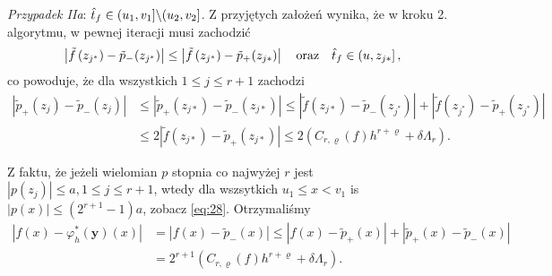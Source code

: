 \documentclass[oik, pdftex, robocza, man]{mgrwms}
\begin{document}
    \textit{Przypadek IIa}: $\hat{t}_{f} \in (u_{1}, v_{1}] \backslash (u_{2}, v_{2}]$.
    Z przyjętych założeń wynika, że w kroku 2. algorytmu, w pewnej iteracji musi zachodzić
    \begin{equation*}
        \left|\tilde{f}\left(z_{j^{*}}\right)-\tilde{p}_{-\!}\left(z_{j^{*}}\right)\right| \leq\left|\tilde{f}\left(z_{j^{*}}\right)-\tilde{p}_{+\!}\left(z_{j *}\right)\right| \quad \text{oraz} \quad \hat{t}_{f} \in\left(u, z_{j *}\right],
    \end{equation*}
    co powoduje, że dla wszystkich $1 \leq j \leq r+1$ zachodzi
    \begin{equation*}
        \begin{aligned}
            \left|\tilde{p}_{+}\left(z_{j}\right)-\tilde{p}_{-}\left(z_{j}\right)\right| & 
            \leq\left|\tilde{p}_{+}\left(z_{j *}\right)-\tilde{p}_{-}\left(z_{j *}\right)\right| \leq\left|\tilde{f}\left(z_{j *}\right)-\tilde{p}_{-}\left(z_{j^{*}}\right)\right|+\left|\tilde{f}\left(z_{j^{*}}\right)-\tilde{p}_{+}\left(z_{j^{*}}\right)\right| \\
            & \leq 2\left|\tilde{f}\left(z_{j *}\right)-\tilde{p}_{+}\left(z_{j *}\right)\right| \leq 2\left(C_{r, \varrho}(f) h^{r+\varrho}+\delta \Lambda_{r}\right).
        \end{aligned}
    \end{equation*}
    
    Z faktu, że jeżeli wielomian $p$ stopnia co najwyżej $r$ jest $\left|p\left(z_{j}\right)\right| \leq a, 1 \leq j \leq r+1$, wtedy dla wszsytkich $u_{1} \leq x<v_{1}$ is $|p(x)| \leq\left(2^{r+1}-1\right) a$, zobacz \eqref{eq:28}. Otrzymaliśmy
    \begin{equation*}
        \begin{aligned}
            \left|f(x)-\varphi_{h}^{*}(\mathbf{y})(x)\right| &=\left|f(x)-\tilde{p}_{-}(x)\right| \leq\left|f(x)-\tilde{p}_{+}(x)\right|+\left|\tilde{p}_{+}(x)-\tilde{p}_{-}(x)\right| \\
            &=2^{r+1}\left(C_{r, \varrho}(f) h^{r+\varrho}+\delta \Lambda_{r}\right).
        \end{aligned}
    \end{equation*}
\end{document}
